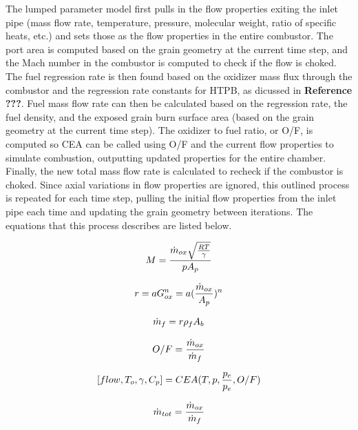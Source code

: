The lumped parameter model first pulls in the flow properties exiting the inlet pipe (mass flow rate, temperature, pressure, molecular weight, ratio of specific heats, etc.) and sets those as the flow properties in the entire combustor. The port area is computed based on the grain geometry at the current time step, and the Mach number in the combustor is computed to check if the flow is choked. The fuel regression rate is then found based on the oxidizer mass flux through the combustor and the regression rate constants for HTPB, as dicussed in \textbf{Reference ???}. Fuel mass flow rate can then be calculated based on the regression rate, the fuel density, and the exposed grain burn surface area (based on the grain geometry at the current time step). The oxidizer to fuel ratio, or O/F, is computed so CEA can be called using O/F and the current flow properties to simulate combustion, outputting updated properties for the entire chamber. Finally, the new total mass flow rate is calculated to recheck if the combustor is choked. Since axial variations in flow properties are ignored, this outlined process is repeated for each time step, pulling the initial flow properties from the inlet pipe each time and updating the grain geometry between iterations. The equations that this process describes are listed below. 

\begin{equation}
\centering   
M=\frac{\dot{m}_{ox}\sqrt{\frac{RT}{\gamma}}}{pA_p}
\end{equation}

\begin{equation}
\centering   
r=aG_{ox}^n=a(\frac{\dot{m}_{ox}}{A_p})^n
\end{equation}

\begin{equation}
\centering   
\dot{m}_f=r\rho_fA_b
\end{equation}

\begin{equation}
\centering   
O/F=\frac{\dot{m}_{ox}}{\dot{m}_f}
\end{equation}

\begin{equation}
\centering   
[flow,T_o,\gamma,C_p]=CEA(T,p,\frac{p_c}{p_e},O/F)
\end{equation}

\begin{equation}
\centering   
\dot{m}_{tot}=\frac{\dot{m}_{ox}}{\dot{m}_f}
\end{equation}

